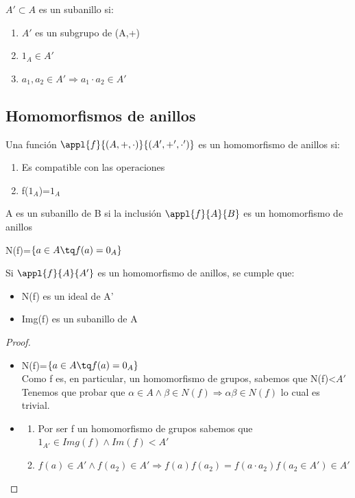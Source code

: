 \documentclass[nochap]{apuntes}
\begin{document}
\begin{defn}[Subanillo]
 $A'\subset A$  es un subanillo si:
 \begin{enumerate}
  \item $A'$  es un subgrupo de (A,+)
  \item $1_A \in A'$
  \item $a_1, a_2 \in A' \Rightarrow a_1\cdot a_2 \in A'$
 \end{enumerate}
\end{defn}

\subsection{Homomorfismos de anillos}
\begin{defn}
Una función $\appl{f}{(A,+,\cdot)}{(A', +', \cdot')}$  es un homomorfismo de anillos si:
\begin{enumerate}
 \item Es compatible con las operaciones
 \item f($1_A$)=$1_A$
\end{enumerate}

\end{defn}
\begin{lemma}
 A es un subanillo de B si la inclusión $\appl{f}{A}{B}$  es un homomorfismo de anillos
\end{lemma}

\begin{defn}[Núcleo]
N(f)=$\{a \in A \tq f(a)=0_A\}$
\end{defn}

\begin{lemma}
 Si $\appl{f}{A}{A'}$  es un homomorfismo de anillos, se cumple que:
 \begin{itemize}
  \item N(f) es un ideal de A'
  \item Img(f) es un subanillo de A
 \end{itemize}
\end{lemma}

\begin{proof}
 \begin{itemize}
  \item N(f)=$\{a \in A \tq f(a)=0_A\}$\\
  Como f es, en particular, un homomorfismo de grupos, sabemos que N(f)<$A'$ \\
  Tenemos que probar que $\alpha \in A \wedge \beta \in N(f) \Rightarrow \alpha\beta \in N(f)$  lo cual es trivial.
  \item \begin{enumerate}
         \item Por ser f un homomorfismo de grupos sabemos que $1_{A'} \in Img(f) \wedge Im(f)<A'$
         \item $f(a)\in A' \wedge f(a_2)\in A' \Rightarrow f(a)f(a_2)=f(a\cdot a_2)f(a_2\in A')\in A'$
        \end{enumerate}
 \end{itemize}
\end{proof}
\end{document}
